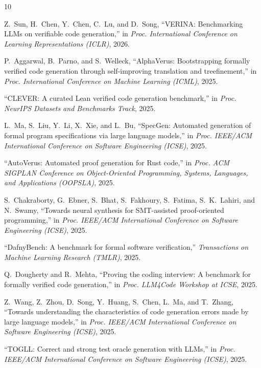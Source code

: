 \documentclass[11pt,a4paper]{article}
\begin{document}
\begin{thebibliography}{10}

Z.~Sun, H.~Chen, Y.~Chen, C.~Lu, and D.~Song, ``VERINA: Benchmarking LLMs on verifiable code generation,'' in \textit{Proc. International Conference on Learning Representations (ICLR)}, 2026.

P.~Aggarwal, B.~Parno, and S.~Welleck, ``AlphaVerus: Bootstrapping formally verified code generation through self-improving translation and treefinement,'' in \textit{Proc. International Conference on Machine Learning (ICML)}, 2025.

``CLEVER: A curated Lean verified code generation benchmark,'' in \textit{Proc. NeurIPS Datasets and Benchmarks Track}, 2025.

L.~Ma, S.~Liu, Y.~Li, X.~Xie, and L.~Bu, ``SpecGen: Automated generation of formal program specifications via large language models,'' in \textit{Proc. IEEE/ACM International Conference on Software Engineering (ICSE)}, 2025.

``AutoVerus: Automated proof generation for Rust code,'' in \textit{Proc. ACM SIGPLAN Conference on Object-Oriented Programming, Systems, Languages, and Applications (OOPSLA)}, 2025.

S.~Chakraborty, G.~Ebner, S.~Bhat, S.~Fakhoury, S.~Fatima, S.~K.~Lahiri, and N.~Swamy, ``Towards neural synthesis for SMT-assisted proof-oriented programming,'' in \textit{Proc. IEEE/ACM International Conference on Software Engineering (ICSE)}, 2025.

``DafnyBench: A benchmark for formal software verification,'' \textit{Transactions on Machine Learning Research (TMLR)}, 2025.

Q.~Dougherty and R.~Mehta, ``Proving the coding interview: A benchmark for formally verified code generation,'' in \textit{Proc. LLM4Code Workshop at ICSE}, 2025.

Z.~Wang, Z.~Zhou, D.~Song, Y.~Huang, S.~Chen, L.~Ma, and T.~Zhang, ``Towards understanding the characteristics of code generation errors made by large language models,'' in \textit{Proc. IEEE/ACM International Conference on Software Engineering (ICSE)}, 2025.

``TOGLL: Correct and strong test oracle generation with LLMs,'' in \textit{Proc. IEEE/ACM International Conference on Software Engineering (ICSE)}, 2025.

\end{thebibliography}
\end{document}
